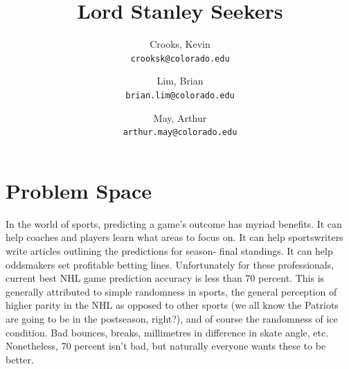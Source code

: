\documentclass[twocolumn,letterpaper,12pt,notitlepage]{article}
\begin{document}
\title{Lord Stanley Seekers}

\author{
  Crooks, Kevin\\
  \texttt{crooksk@colorado.edu}
  \and
  Lim, Brian\\
  \texttt{brian.lim@colorado.edu}
  \and
  May, Arthur\\
  \texttt{arthur.may@colorado.edu}
}





\section{Problem Space}
In the world of sports, predicting a game’s outcome has myriad benefits. It can help coaches and players
learn what areas to focus on. It can help sportswriters write articles outlining the predictions for season-
final standings. It can help oddsmakers set profitable betting lines. Unfortunately for these professionals, current best NHL game prediction accuracy is less than 70 percent. This is generally attributed to simple
randomness in sports, the general perception of higher parity in the NHL as opposed to other sports (we
all know the Patriots are going to be in the postseason, right?), and of course the randomness of ice
condition. Bad bounces, breaks, millimetres in difference in skate angle, etc. Nonetheless, 70 percent isn’t bad,
but naturally everyone wants these to be better.  \newline
\end{document}
